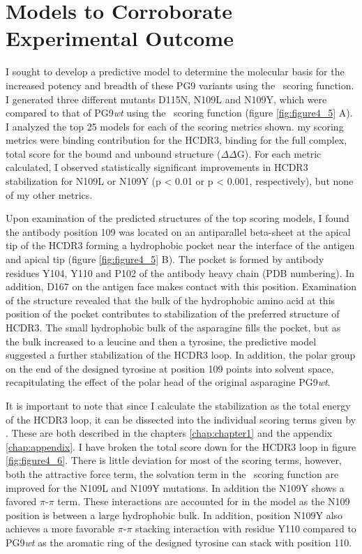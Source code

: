 \section{Models to Corroborate Experimental Outcome}
I sought to develop a predictive model to determine the molecular basis for the increased potency and breadth of these PG9 variants using the \rosetta~scoring function. I generated three different mutants D115N, N109L and N109Y, which were compared to that of PG9\textit{wt} using the \rosetta~scoring function (figure \ref{fig:figure4_5} A). I analyzed the top 25 models for each of the scoring metrics shown. my scoring metrics were binding contribution for the HCDR3, binding for the full complex, total score for the bound and unbound structure ($\Delta\Delta$G). For each metric calculated, I observed statistically significant improvements in HCDR3 stabilization for N109L or N109Y (p < 0.01 or p < 0.001, respectively), but none of my other metrics.

Upon examination of the predicted structures of the top scoring models, I found the antibody position 109 was located on an antiparallel beta-sheet at the apical tip of the HCDR3 forming a hydrophobic pocket near the interface of the antigen and apical tip (figure \ref{fig:figure4_5} B). The pocket is formed by antibody residues Y104, Y110 and P102 of the antibody heavy chain (PDB numbering). In addition, D167 on the antigen face makes contact with this position. Examination of the structure revealed that the bulk of the hydrophobic amino acid at this position of the pocket contributes to stabilization of the preferred structure of HCDR3. The small hydrophobic bulk of the asparagine fills the pocket, but as the bulk increased to a leucine and then a tyrosine, the predictive model suggested a further stabilization of the HCDR3 loop. In addition, the polar group on the end of the designed tyrosine at position 109 points into solvent space, recapitulating the effect of the polar head of the original asparagine PG9\textit{wt}.

It is important to note that since I calculate the stabilization as the total energy of the HCDR3 loop, it can be dissected into the individual scoring terms given by \rosetta. These are both described in the chapters \ref{chap:chapter1} and the appendix \ref{chap:appendix}. I have broken the total score down for the HCDR3 loop in figure \ref{fig:figure4_6}. There is little deviation for most of the scoring terms, however, both the attractive force term, the solvation term in the \rosetta~scoring function are improved for the N109L and N109Y mutations. In addition the N109Y shows a favored $\pi$-$\pi$ term. These interactions are accounted for in the model as the N109 position is between a large hydrophobic bulk. In addition, position N109Y also achieves a more favorable $\pi$-$\pi$ stacking interaction with residue Y110 compared to PG9\textit{wt} as the aromatic ring of the designed tyrosine can stack with position 110.

